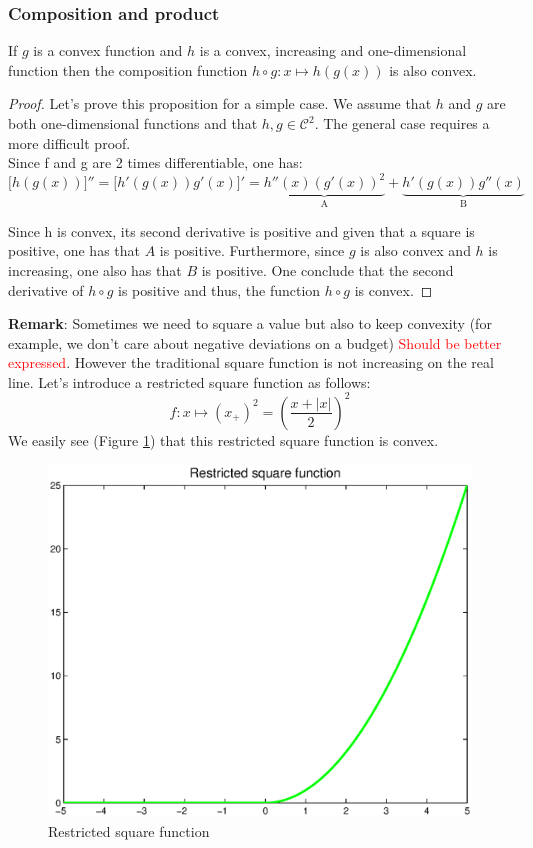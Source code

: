 \subsubsection{Composition and product}
\begin{property}
If $g$ is a convex function and $h$ is a convex, increasing and one-dimensional function then the composition function $h \circ g: x \mapsto h(g(x))$ is also convex. 
\end{property}
\begin{proof}
Let's prove this proposition for a simple case. We assume that $h$ and $g$ are both one-dimensional functions and that $h,g \in \mathcal{C}^2$. The general case requires a more difficult proof. \\
Since f and g are 2 times differentiable, one has:
$$\big[ h(g(x))\big]'' = \big[ h'(g(x))g'(x)\big]' = \underbrace{h''(x)(g'(x))^2}_\text{A} + \underbrace{h'(g(x))g''(x)}_\text{B} $$

Since h is convex, its second derivative is positive and given that a square is positive, one has that $A$ is positive. Furthermore, since $g$ is also convex and $h$ is increasing, one also has that $B$ is positive. One conclude that the second derivative of $h \circ g$ is positive and thus, the function $h \circ g$ is convex. 
\end{proof}
\textbf{Remark}: Sometimes we need to square a value but also to keep convexity (for example, we don't care about negative deviations on a budget) \textcolor{red}{Should be better expressed}. However the traditional square function is not increasing on the real line. Let's introduce a restricted square function as follows: 
$$f: x \mapsto (x_+)^2 = (\frac{x + |x|}{2})^2$$
We easily see (Figure \ref{restricted}) that this restricted square function is convex.

\begin{figure}[H]
\begin{center}
\includegraphics[scale=0.5]{./images/Course4_restrictedsquare.eps}
\caption{Restricted square function}
\label{restricted}
\end{center}
\end{figure}

